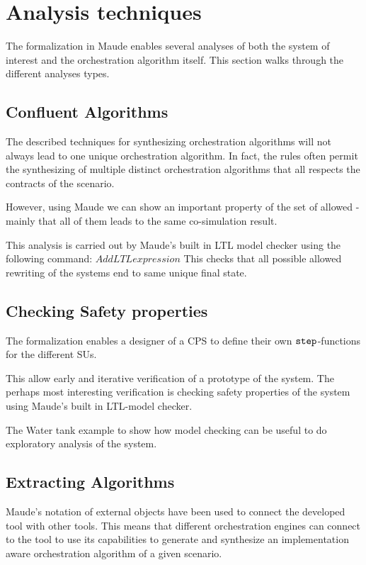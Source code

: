 \section{Analysis techniques}\label{sc:casestudy}

The formalization in Maude enables several analyses of both the system of interest and the orchestration algorithm itself. 
This section walks through the different analyses types.

\subsection{Confluent Algorithms}
The described techniques for synthesizing orchestration algorithms will not always lead to one unique orchestration algorithm.
In fact, the rules often permit the synthesizing of multiple distinct orchestration algorithms that all respects the contracts of the scenario.

However, using Maude we can show an important property of the set of allowed - mainly that all of them leads to the same co-simulation result.

This analysis is carried out by Maude's built in LTL model checker using the following command:
$Add LTL expression$
This checks that all possible allowed rewriting of the systems end to same unique final state.

\subsection{Checking Safety properties}
The formalization enables a designer of a CPS to define their own $\mathtt{step}_{}$-functions for the different SUs.  

This allow early and iterative verification of a prototype of the system. 
The perhaps most interesting verification is checking safety properties of the system using Maude's built in LTL-model checker. 

The Water tank example to show how model checking can be useful to do exploratory analysis of the system.

\subsection{Extracting Algorithms}
Maude's notation of external objects  have been used to connect the developed tool with other tools. 
This means that different orchestration engines can connect to the tool to use its capabilities to generate and synthesize an implementation aware orchestration algorithm of a given scenario.

